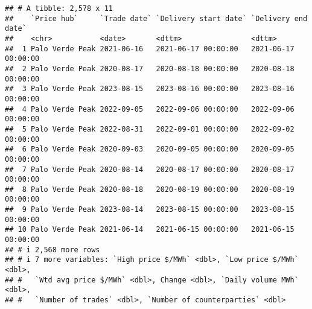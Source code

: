 \documentclass[
]{article}
\newenvironment{Shaded}{\begin{snugshade}}{\end{snugshade}}
\newcommand{\AttributeTok}[1]{\textcolor[rgb]{0.13,0.29,0.53}{#1}}
\newcommand{\CommentTok}[1]{\textcolor[rgb]{0.56,0.35,0.01}{\textit{#1}}}
\newcommand{\FunctionTok}[1]{\textcolor[rgb]{0.13,0.29,0.53}{\textbf{#1}}}
\newcommand{\NormalTok}[1]{#1}
\newcommand{\OtherTok}[1]{\textcolor[rgb]{0.56,0.35,0.01}{#1}}
\newcommand{\SpecialCharTok}[1]{\textcolor[rgb]{0.81,0.36,0.00}{\textbf{#1}}}
\newcommand{\StringTok}[1]{\textcolor[rgb]{0.31,0.60,0.02}{#1}}
\begin{document}
\begin{Shaded}
\end{Shaded}

\begin{verbatim}
## # A tibble: 2,578 x 11
##    `Price hub`     `Trade date` `Delivery start date` `Delivery end date`
##    <chr>           <date>       <dttm>                <dttm>             
##  1 Palo Verde Peak 2021-06-16   2021-06-17 00:00:00   2021-06-17 00:00:00
##  2 Palo Verde Peak 2020-08-17   2020-08-18 00:00:00   2020-08-18 00:00:00
##  3 Palo Verde Peak 2023-08-15   2023-08-16 00:00:00   2023-08-16 00:00:00
##  4 Palo Verde Peak 2022-09-05   2022-09-06 00:00:00   2022-09-06 00:00:00
##  5 Palo Verde Peak 2022-08-31   2022-09-01 00:00:00   2022-09-02 00:00:00
##  6 Palo Verde Peak 2020-09-03   2020-09-05 00:00:00   2020-09-05 00:00:00
##  7 Palo Verde Peak 2020-08-14   2020-08-17 00:00:00   2020-08-17 00:00:00
##  8 Palo Verde Peak 2020-08-18   2020-08-19 00:00:00   2020-08-19 00:00:00
##  9 Palo Verde Peak 2023-08-14   2023-08-15 00:00:00   2023-08-15 00:00:00
## 10 Palo Verde Peak 2021-06-14   2021-06-15 00:00:00   2021-06-15 00:00:00
## # i 2,568 more rows
## # i 7 more variables: `High price $/MWh` <dbl>, `Low price $/MWh` <dbl>,
## #   `Wtd avg price $/MWh` <dbl>, Change <dbl>, `Daily volume MWh` <dbl>,
## #   `Number of trades` <dbl>, `Number of counterparties` <dbl>
\end{verbatim}
\end{document}
